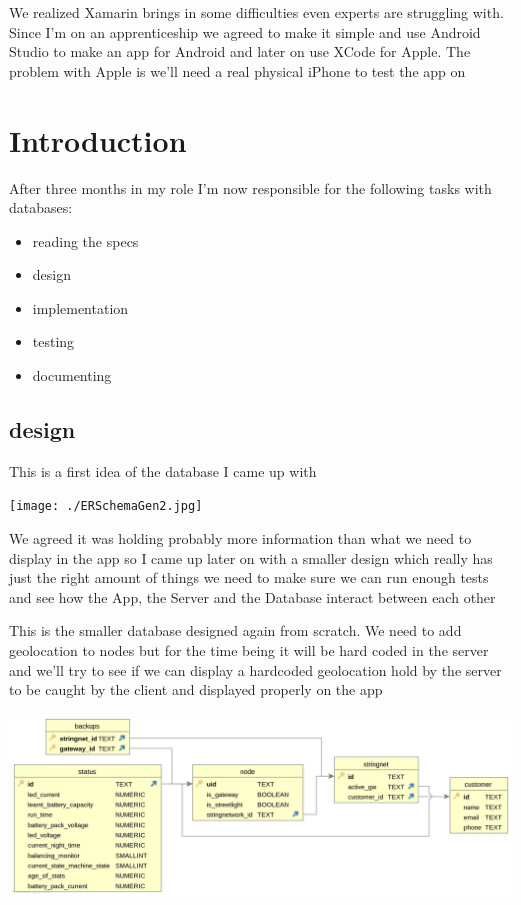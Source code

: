 \documentclass[a4paper,12pt]{article}
\begin{document}
We realized Xamarin brings in some difficulties even experts are struggling with. Since I'm on an apprenticeship we agreed to make it simple and use Android Studio to make an app for Android and later on use XCode for Apple. The problem with Apple is we'll need a real physical iPhone to test the app on

 

\section{Introduction}

After three months in my role I'm now responsible for the following tasks with databases:

\begin{itemize}
\item {reading the specs}
\item design
\item implementation
\item testing 
\item documenting
\end{itemize}

\clearpage

\subsection{design}
This is a first idea of the database I came up with

\noindent \texttt{[image: ./ERSchemaGen2.jpg]}

We agreed it was holding probably more information than what we need to display in the app so I came up later on with a smaller design which really has just the right amount of things we need to make sure we can run enough tests and see how the App, the Server and the Database interact between each other
\clearpage

This is the smaller database designed again from scratch. We need to add geolocation to nodes but for the time being it will be hard coded in the server and we'll try to see if we can display a hardcoded geolocation hold by the server to be caught by the client and displayed properly on the app

\noindent \includegraphics[width=14cm]{./SecondERSchemaGen2.jpg}

\printindex
\end{document}

